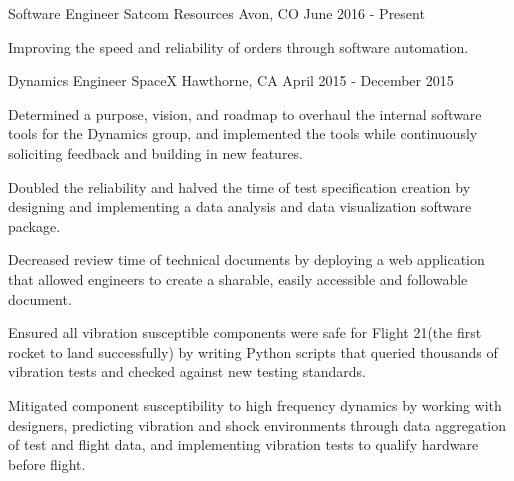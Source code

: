 

\begin{cventries}

  \cventry
    {Software Engineer} %
    {Satcom Resources} %
    {Avon, CO} %
    {June 2016 - Present} %
    {
      \begin{cvitems} %
        \item {Improving the speed and reliability of orders through software automation.}
      \end{cvitems}
    }

  \cventry
    {Dynamics Engineer} %
    {SpaceX} %
    {Hawthorne, CA} %
    {April 2015 - December 2015} %
    {
      \begin{cvitems} %
        \item{Determined a purpose, vision, and roadmap to overhaul the internal software tools for the Dynamics group, and implemented the tools while continuously soliciting feedback and building in new features.}
        \item {Doubled the reliability and halved the time of test specification creation by designing and implementing a data analysis and data visualization software package.}
        \item {Decreased review time of technical documents by deploying a web application that allowed engineers to create a sharable, easily accessible and followable document.}
        \item {Ensured all vibration susceptible components were safe for Flight 21(the first rocket to land successfully) by writing Python scripts that queried thousands of vibration tests and checked against new testing standards.}
        \item {Mitigated component susceptibility to high frequency dynamics by working with designers, predicting vibration and shock environments through data aggregation of test and flight data, and implementing vibration tests to qualify hardware before flight.}
      \end{cvitems}
    }


\end{cventries}
